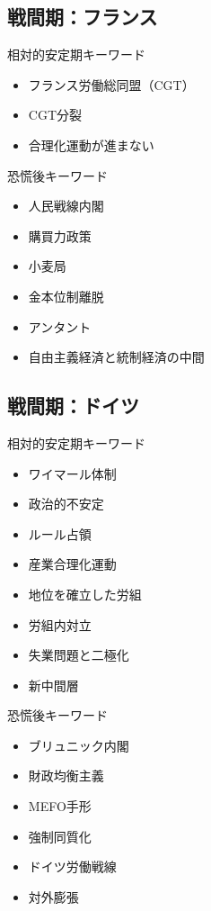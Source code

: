 \documentclass{jsarticle}
\begin{document}
\subsection{戦間期：フランス}
相対的安定期キーワード
\begin{itemize}
\item フランス労働総同盟（CGT）
\item CGT分裂
\item 合理化運動が進まない
\end{itemize}
恐慌後キーワード
\begin{itemize}
\item 人民戦線内閣
\item 購買力政策
\item 小麦局
\item 金本位制離脱
\item アンタント
\item 自由主義経済と統制経済の中間
\end{itemize}

\subsection{戦間期：ドイツ}
相対的安定期キーワード
\begin{itemize}
\item ワイマール体制
\item 政治的不安定
\item ルール占領
\item 産業合理化運動
\item 地位を確立した労組
\item 労組内対立
\item 失業問題と二極化
\item 新中間層
\end{itemize}
恐慌後キーワード
\begin{itemize}
\item ブリュニック内閣
\item 財政均衡主義
\item MEFO手形
\item 強制同質化
\item ドイツ労働戦線
\item 対外膨張
\end{itemize}
\end{document}
